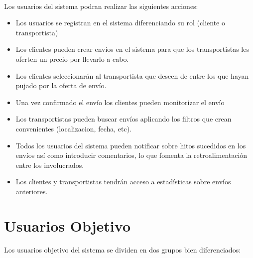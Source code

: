 \documentclass[10pt, a4paper,spanish]{article}
\begin{document}
			\paragraph{}
			Los usuarios del sistema podran realizar las siguientes acciones:

			\begin{itemize}

				\item Los usuarios se registran en el sistema diferenciando su rol (cliente o transportista)

				\item Los clientes pueden crear envíos en el sistema para que los transportistas les oferten un precio por llevarlo a cabo.

				\item Los clientes seleccionarán al transportista que deseen de entre los que hayan pujado por la oferta de envío.

				\item Una vez confirmado el envío los clientes pueden monitorizar el envío

				\item Los transportistas pueden buscar envíos aplicando los filtros que crean convenientes (localizacion, fecha, etc).

				\item Todos los usuarios del sistema pueden notificar sobre hitos sucedidos en los envíos así como introducir comentarios, lo que fomenta la retroalimentación entre los involucrados.

				\item Los clientes y transportistas tendrán acceso a estadísticas sobre envíos anteriores.


			\end{itemize}



		\section{Usuarios Objetivo}

			\paragraph{}
			Los usuarios objetivo del sistema se dividen en dos grupos bien diferenciados:
\end{document}
